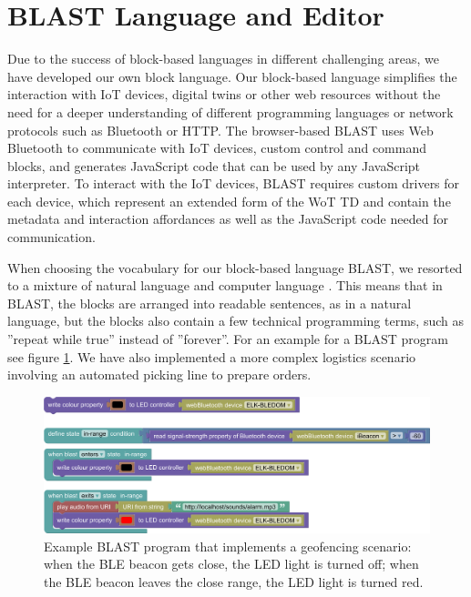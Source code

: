 \documentclass[runningheads]{llncs}
\begin{document}
\section{BLAST Language and Editor}

Due to the success of block-based languages in different challenging areas, we have developed our own block language.
Our block-based language simplifies the interaction with IoT devices, digital twins or other web resources without the need for a deeper understanding of different programming languages or network protocols such as Bluetooth or HTTP.
The browser-based BLAST uses Web Bluetooth to communicate with IoT devices, custom control and command blocks, and generates JavaScript code that can be used by any JavaScript interpreter.
To interact with the IoT devices, BLAST requires custom drivers for each device, which represent an extended form of the WoT TD %
and contain the metadata and interaction affordances as well as the JavaScript code needed for communication.

When choosing the vocabulary for our block-based language BLAST, we resorted to a mixture of natural language and computer language \cite{8120404}.
This means that in BLAST, the blocks are arranged into readable sentences, as in a natural language, but the blocks also contain a few technical programming terms, such as ''repeat while true'' instead of ''forever''.
For an example for a BLAST program see figure \ref{fig1}.
We have also implemented a more complex logistics scenario involving an automated picking line to prepare orders.

\begin{figure}
\includegraphics[width=\textwidth]{screenshot 3.png}%
\caption{Example BLAST program that implements a geofencing scenario: when the BLE beacon gets close, the LED light is turned off; when the BLE beacon leaves the close range, the LED light is turned red.} \label{fig1}
\end{figure}
\end{document}
